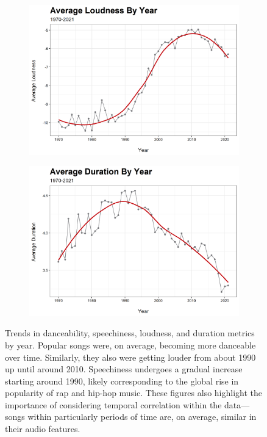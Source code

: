 \documentclass[12pt, twoside]{article}
\begin{document}
\begin{figure}[H]
\begin{subfigure}[b]{0.5\textwidth}
\includegraphics[width = \textwidth]{track_loudness_trend_.png}
\caption{}
\label{fig:loudness_trend}
\end{subfigure}
\begin{subfigure}[b]{0.5\textwidth}
\centering
\includegraphics[width = \textwidth]{track_duration_trend_.png}
\caption{}
\label{fig:duration_trend}
\end{subfigure}
\caption{Trends in danceability, speechiness, loudness, and duration metrics by year. Popular songs were, on average, becoming more danceable over time. Similarly, they also were getting louder from about 1990 up until around 2010.  Speechiness undergoes a gradual increase starting around 1990, likely corresponding to the global rise in popularity of rap and hip-hop music. These figures also highlight the importance of considering temporal correlation within the data---songs within particularly periods of time are, on average, similar in their audio features.}
\label{fig:multipart_figure}
\end{figure}
\end{document}
